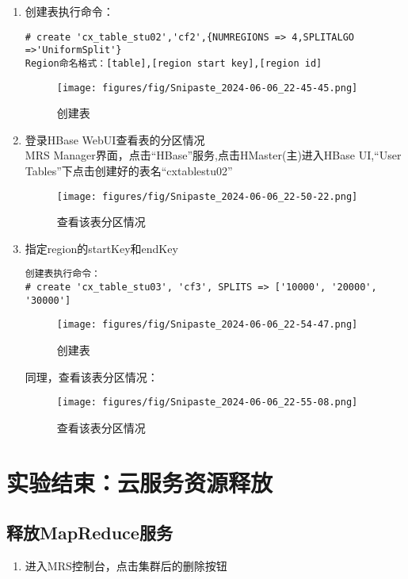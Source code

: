 \documentclass[12pt,hyperref,a4paper,UTF8]{ctexart}
\begin{document}
\begin{enumerate}
    \item 创建表执行命令：
    \begin{verbatim}
# create 'cx_table_stu02','cf2',{NUMREGIONS => 4,SPLITALGO =>'UniformSplit'}
Region命名格式：[table],[region start key],[region id]
    \end{verbatim} 
    \begin{figure}[H]
        \centering
        \texttt{[image: figures/fig/Snipaste\_2024-06-06\_22-45-45.png]}
        \caption{创建表}
        \label{fig:8}
    \end{figure} 


    \item 登录HBase WebUI查看表的分区情况\\
    MRS Manager界面，点击“HBase”服务,点击HMaster(主)进入HBase UI,“User Tables”下点击创建好的表名“cxtablestu02”
    \begin{figure}[H]
        \centering
        \texttt{[image: figures/fig/Snipaste\_2024-06-06\_22-50-22.png]}
        \caption{查看该表分区情况}
        \label{fig:8}
    \end{figure} 


    \item 指定region的startKey和endKey
    \begin{verbatim}
创建表执行命令：
# create 'cx_table_stu03', 'cf3', SPLITS => ['10000', '20000', '30000']
    \end{verbatim} 
    \begin{figure}[H]
        \centering
        \texttt{[image: figures/fig/Snipaste\_2024-06-06\_22-54-47.png]}
        \caption{创建表}
        \label{fig:8}
    \end{figure} 
    同理，查看该表分区情况：
    \begin{figure}[H]
        \centering
        \texttt{[image: figures/fig/Snipaste\_2024-06-06\_22-55-08.png]}
        \caption{查看该表分区情况}
        \label{fig:8}
    \end{figure} 
\end{enumerate}


\section{实验结束：云服务资源释放}

\subsection*{释放MapReduce服务}
\begin{enumerate}
    \item 进入MRS控制台，点击集群后的删除按钮
\end{enumerate}
\end{document}
